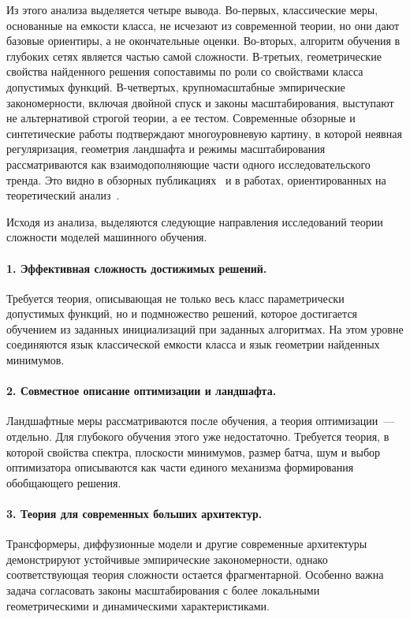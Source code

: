 \documentclass[russian]{intsys}
\begin{document}
Из этого анализа выделяется четыре вывода.
Во-первых, классические меры, основанные на емкости класса, не исчезают из современной теории, но  они дают базовые ориентиры, а не окончательные оценки.
Во-вторых, алгоритм обучения в глубоких сетях является частью самой сложности.
В-третьих, геометрические свойства найденного решения сопоставимы по роли со свойствами класса допустимых функций.
В-четвертых, крупномасштабные эмпирические закономерности, включая двойной спуск и законы масштабирования, выступают не альтернативой строгой теории, а ее тестом.
Современные обзорные и синтетические работы подтверждают многоуровневую картину, в которой неявная регуляризация, геометрия ландшафта и режимы масштабирования рассматриваются как взаимодополняющие части одного исследовательского тренда. Это видно в обзорных публикациях~\cite{hu2021complexitysurvey,recent2020theory,belkin2021overview} и в работах, ориентированных на теоретический анализ~\cite{explaining2021thesis,poggio2020theoretical,implicit2026synthesis}.

Исходя из анализа, выделяются следующие направления исследований теории сложности моделей машинного обучения.

\paragraph{1. Эффективная сложность достижимых решений.}
Требуется теория, описывающая не только весь класс параметрически допустимых функций, но и подмножество решений, которое достигается обучением из заданных инициализаций при заданных алгоритмах.
На этом уровне соединяются язык классической емкости класса и язык геометрии найденных минимумов.

\paragraph{2. Совместное описание оптимизации и ландшафта.}
Ландшафтные меры рассматриваются после обучения, а теория оптимизации~--- отдельно.
Для глубокого обучения этого уже недостаточно.
Требуется теория, в которой свойства спектра, плоскости минимумов, размер батча, шум и выбор оптимизатора описываются как части единого механизма формирования обобщающего решения.

\paragraph{3. Теория для современных больших архитектур.}
Трансформеры, диффузионные модели и другие современные архитектуры демонстрируют устойчивые эмпирические закономерности, однако соответствующая теория сложности остается фрагментарной.
Особенно важна задача согласовать законы масштабирования с более локальными геометрическими и динамическими характеристиками.
\end{document}
